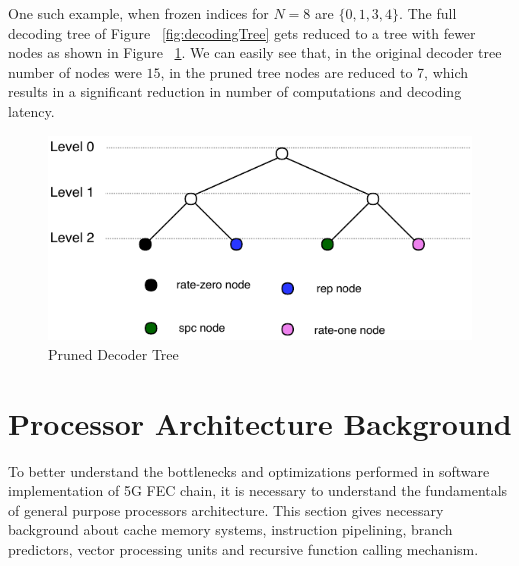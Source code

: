 One such example, when frozen indices for $N = 8$ are $\{0,1,3,4\}$. The full decoding tree of Figure ~\ref{fig:decodingTree} gets reduced to a tree with fewer nodes as shown in Figure ~\ref{fig:decodingTreePruned}. We can easily see that, in the original decoder tree number of nodes were $15$, in the pruned tree nodes are reduced to 7, which results in a significant reduction in number of computations and decoding latency.

\begin{figure}[h]
	\includegraphics{./figures/decodingTreePruned.pdf}
	\caption{Pruned Decoder Tree}
	\label{fig:decodingTreePruned}
\end{figure}




\section{Processor Architecture Background}
To better understand the bottlenecks and optimizations performed in software implementation of 5G FEC chain, it is necessary to understand the fundamentals of general purpose processors architecture. This section gives necessary background about cache memory systems, instruction pipelining, branch predictors, vector processing units and recursive function calling mechanism.

